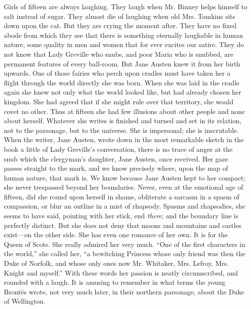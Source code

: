 Girls of fifteen are always laughing. They laugh when Mr. Binney helps himself to salt instead of sugar. They almost die of laughing when old Mrs. Tomkins sits down upon the cat. But they are crying the moment after. They have no fixed abode from which they see that there is something eternally laughable in human nature, some quality in men and women that for ever excites our satire. They do not know that Lady Greville who snubs, and poor Maria who is snubbed, are permanent features of every ball-room. But Jane Austen knew it from her birth upwards. One of those fairies who perch upon cradles must have taken her a flight through the world directly she was born. When she was laid in the cradle again she knew not only what the world looked like, but had already chosen her kingdom. She had agreed that if she might rule over that territory, she would covet no other. Thus at fifteen she had few illusions about other people and none about herself. Whatever she writes is finished and turned and set in its relation, not to the parsonage, but to the universe. She is impersonal; she is inscrutable. When the writer, Jane Austen, wrote down in the most remarkable sketch in the book a little of Lady Greville's conversation, there is no trace of anger at the snub which the clergyman's daughter, Jane Austen, once received. Her gaze passes straight to the mark, and we know precisely where, upon the map of human nature, that mark is. We know because Jane Austen kept to her compact; she never trespassed beyond her boundaries. Never, even at the emotional age of fifteen, did she round upon herself in shame, obliterate a sarcasm in a spasm of compassion, or blur an outline in a mist of rhapsody. Spasms and rhapsodies, she seems to have said, pointing with her stick, end \textit{there}; and the boundary line is perfectly distinct. But she does not deny that moons and mountains and castles exist—on the other side. She has even one romance of her own. It is for the Queen of Scots. She really admired her very much. ``One of the first characters in the world,'' she called her, ``a bewitching Princess whose only friend was then the Duke of Norfolk, and whose only ones now Mr. Whitaker, Mrs. Lefroy, Mrs. Knight and myself.'' With these words her passion is neatly circumscribed, and rounded with a laugh. It is amusing to remember in what terms the young Brontës wrote, not very much later, in their northern parsonage, about the Duke of Wellington.

